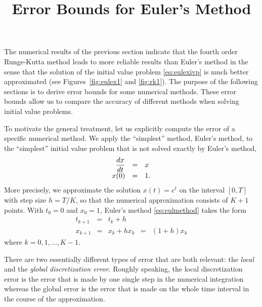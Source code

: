 \documentclass{ximera}
\title{Error Bounds for Euler's Method}
\begin{document}
\begin{abstract}
\end{abstract}
\maketitle


\label{sec:EEEM}

The numerical results of the previous section indicate that the 
fourth order Runge-Kutta method leads to more reliable results than 
Euler's method in the sense that the solution of the initial value 
problem \eqref{eq:eulexivp} is much better approximated 
(see Figures~\ref{fig:eulex1} 
and \ref{fig:rk1}).  The purpose of the following sections
is to derive error bounds 
for some numerical methods. These error 
bounds allow us to compare the accuracy of different methods 
when solving initial value problems.

To motivate the general treatment, let us explicitly compute
the error of a specific numerical method. We apply the ``simplest'' 
method, Euler's method, to the ``simplest'' 
initial value problem
that is not solved exactly by Euler's method,
\begin{equation} \label{eq:simplest}
\begin{array}{rcl}
\displaystyle\frac{dx}{dt} & = & x \\
x(0) & = & 1.
\end{array}
\end{equation}
More precisely, we approximate the solution $x(t)=e^t$
on the interval $[0,T]$ with step size $h=T/K$, so 
that the numerical approximation consists of $K+1$ points.  
With $t_0=0$ and $x_0=1$, 
Euler's method  \eqref{eq:eulmethod} takes the form 
\[
\begin{array}{rclcl}
t_{k+1} & = & t_k+h & & \\
x_{k+1} & = & x_k + h x_k & = & (1+h)x_k
\end{array}
\]
where $k=0,1,\ldots,K-1$.

There are two essentially different types of error that are
both relevant: the {\em local\/} and the {\em global discretization 
error}.
Roughly speaking, the local discretization error is the error
that is made by one single step in the numerical integration whereas the
global error is the error that is made on the whole time interval
in the course of the approximation.  
\end{document}
